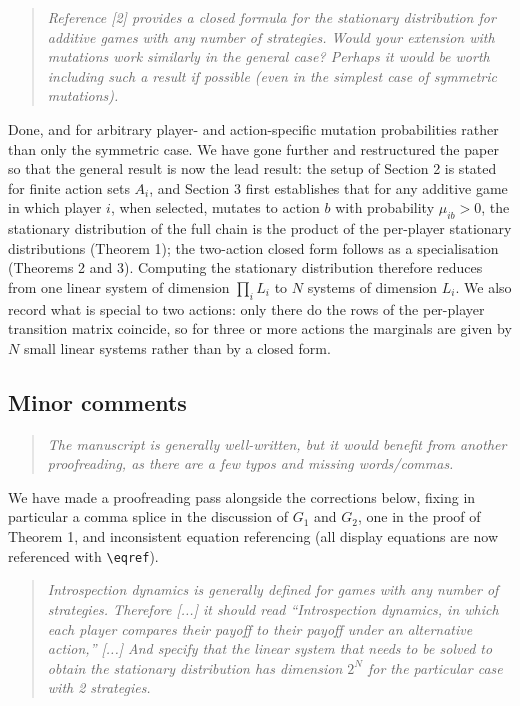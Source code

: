 \documentclass[11pt]{article}
\newenvironment{reviewerquote}
  {\begin{quote}\itshape}
  {\end{quote}}
\begin{document}
\begin{reviewerquote}
Reference [2] provides a closed formula for the stationary distribution for
additive games with any number of strategies. Would your extension with
mutations work similarly in the general case? Perhaps it would be worth
including such a result if possible (even in the simplest case of symmetric
mutations).
\end{reviewerquote}

Done, and for arbitrary player- and action-specific mutation probabilities
rather than only the symmetric case. We have gone further and restructured
the paper so that the general result is now the lead result: the setup of
Section 2 is stated for finite action sets \(A_i\), and Section 3 first
establishes that for any additive game in which player \(i\), when selected,
mutates to action \(b\) with probability \(\mu_{ib}>0\), the stationary
distribution of the full chain is the product of the per-player stationary
distributions (Theorem 1); the two-action closed form follows as a
specialisation (Theorems 2 and 3). Computing the stationary distribution
therefore reduces from one linear system of dimension \(\prod_i L_i\) to
\(N\) systems of dimension \(L_i\). We also record what is special to two
actions: only there do the rows of the per-player transition matrix
coincide, so for three or more actions the marginals are given by \(N\)
small linear systems rather than by a closed form.

\subsection*{Minor comments}

\begin{reviewerquote}
The manuscript is generally well-written, but it would benefit from another
proofreading, as there are a few typos and missing words/commas.
\end{reviewerquote}

We have made a proofreading pass alongside the corrections below, fixing in
particular a comma splice in the discussion of \(G_1\) and \(G_2\), one in
the proof of Theorem 1, and inconsistent equation referencing (all display
equations are now referenced with \verb|\eqref|).

\begin{reviewerquote}
Introspection dynamics is generally defined for games with any number of
strategies. Therefore [...] it should read ``Introspection dynamics, in which
each player compares their payoff to their payoff under an alternative
action,'' [...] And specify that the linear system that needs to be solved to
obtain the stationary distribution has dimension \(2^N\) for the particular
case with 2 strategies.
\end{reviewerquote}
\end{document}
